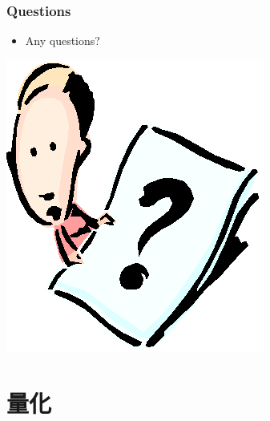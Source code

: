\documentclass[CJKutf8,xcolor=pdftex,dvipsnames,table]{beamer}
\begin{document}
\begin{CJK*}{UTF8}{song}
  \begin{frame}
    \frametitle{Questions}
    \begin{itemize}
    \item Any questions?
    \end{itemize}
    \begin{center}
      \includegraphics[scale=.5]{question}
    \end{center}
  \end{frame} 
  
	\section{量化}

\end{CJK*}
\end{document}
